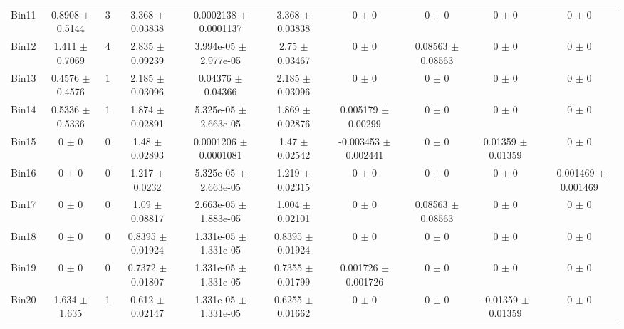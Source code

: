 \begin{tabular}{@{\extracolsep{4pt}}lccccccccc@{}}
     Bin11 & 0.8908 $\pm$ 0.5144 & 3 & 3.368 $\pm$ 0.03838 & 0.0002138 $\pm$ 0.0001137 & 3.368 $\pm$ 0.03838 & 0 $\pm$ 0 & 0 $\pm$ 0 & 0 $\pm$ 0 & 0 $\pm$ 0 \\ 
     Bin12 & 1.411 $\pm$ 0.7069 & 4 & 2.835 $\pm$ 0.09239 & 3.994e-05 $\pm$ 2.977e-05 & 2.75 $\pm$ 0.03467 & 0 $\pm$ 0 & 0.08563 $\pm$ 0.08563 & 0 $\pm$ 0 & 0 $\pm$ 0 \\ 
     Bin13 & 0.4576 $\pm$ 0.4576 & 1 & 2.185 $\pm$ 0.03096 & 0.04376 $\pm$ 0.04366 & 2.185 $\pm$ 0.03096 & 0 $\pm$ 0 & 0 $\pm$ 0 & 0 $\pm$ 0 & 0 $\pm$ 0 \\ 
     Bin14 & 0.5336 $\pm$ 0.5336 & 1 & 1.874 $\pm$ 0.02891 & 5.325e-05 $\pm$ 2.663e-05 & 1.869 $\pm$ 0.02876 & 0.005179 $\pm$ 0.00299 & 0 $\pm$ 0 & 0 $\pm$ 0 & 0 $\pm$ 0 \\ 
     Bin15 & 0 $\pm$ 0 & 0 & 1.48 $\pm$ 0.02893 & 0.0001206 $\pm$ 0.0001081 & 1.47 $\pm$ 0.02542 & -0.003453 $\pm$ 0.002441 & 0 $\pm$ 0 & 0.01359 $\pm$ 0.01359 & 0 $\pm$ 0 \\ 
     Bin16 & 0 $\pm$ 0 & 0 & 1.217 $\pm$ 0.0232 & 5.325e-05 $\pm$ 2.663e-05 & 1.219 $\pm$ 0.02315 & 0 $\pm$ 0 & 0 $\pm$ 0 & 0 $\pm$ 0 & -0.001469 $\pm$ 0.001469 \\ 
     Bin17 & 0 $\pm$ 0 & 0 & 1.09 $\pm$ 0.08817 & 2.663e-05 $\pm$ 1.883e-05 & 1.004 $\pm$ 0.02101 & 0 $\pm$ 0 & 0.08563 $\pm$ 0.08563 & 0 $\pm$ 0 & 0 $\pm$ 0 \\ 
     Bin18 & 0 $\pm$ 0 & 0 & 0.8395 $\pm$ 0.01924 & 1.331e-05 $\pm$ 1.331e-05 & 0.8395 $\pm$ 0.01924 & 0 $\pm$ 0 & 0 $\pm$ 0 & 0 $\pm$ 0 & 0 $\pm$ 0 \\ 
     Bin19 & 0 $\pm$ 0 & 0 & 0.7372 $\pm$ 0.01807 & 1.331e-05 $\pm$ 1.331e-05 & 0.7355 $\pm$ 0.01799 & 0.001726 $\pm$ 0.001726 & 0 $\pm$ 0 & 0 $\pm$ 0 & 0 $\pm$ 0 \\ 
     Bin20 & 1.634 $\pm$ 1.635 & 1 & 0.612 $\pm$ 0.02147 & 1.331e-05 $\pm$ 1.331e-05 & 0.6255 $\pm$ 0.01662 & 0 $\pm$ 0 & 0 $\pm$ 0 & -0.01359 $\pm$ 0.01359 & 0 $\pm$ 0 \\ 
\hline\hline
  \end{tabular}
